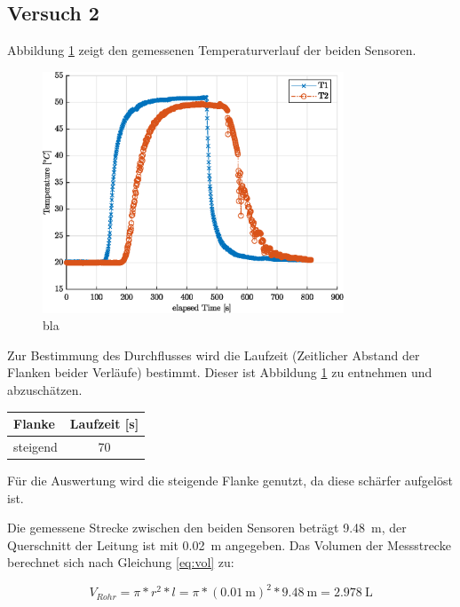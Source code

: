 \subsection{Versuch 2}


Abbildung \ref{fig:temp} zeigt den gemessenen Temperaturverlauf der beiden Sensoren.
\begin{figure}[H]
	\centering
	\includegraphics[width=0.8\textwidth]{../DATA/tempPlot.eps}
	\caption[bla]{bla}
	\label{fig:temp}
\end{figure}

Zur Bestimmung des Durchflusses wird  die Laufzeit (Zeitlicher Abstand der Flanken beider Verläufe) bestimmt. Dieser ist Abbildung \ref{fig:temp} zu entnehmen und abzuschätzen.

\begin{center}
	\begin{tabular}{l|c}
		\label{tab:}
		
		\textbf{Flanke} & \textbf{Laufzeit} [s]\\
		\hline
		steigend & 70 
	\end{tabular}
\end{center}

Für die Auswertung wird die steigende Flanke genutzt, da diese schärfer aufgelöst ist.

Die gemessene Strecke zwischen den beiden Sensoren beträgt \SI{9,48}{\meter}, der Querschnitt der Leitung ist mit \SI{0,02}{\meter} angegeben. Das Volumen der Messstrecke berechnet sich nach Gleichung \ref{eq:vol} zu:

\begin{equation}
	\label{eq:vol}
	V_{Rohr} = \pi * r^2 * l = \pi * (\SI{0,01}{\meter})^2 * \SI{9,48}{\meter} = \SI{2,978}{\liter}
\end{equation}

